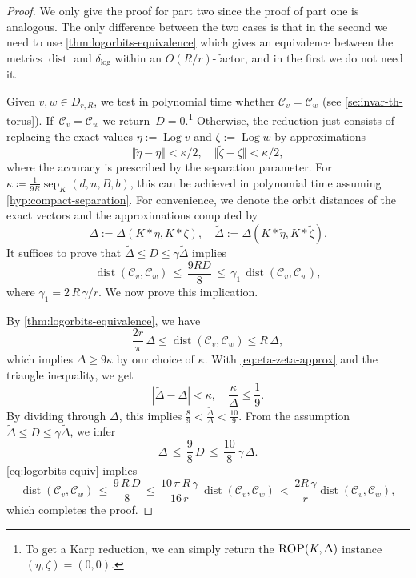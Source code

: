 \documentclass[10pt,a4paper]{article}
\theoremstyle{definition}
\DeclareMathOperator{\sep}{sep}
\DeclareMathOperator{\Log}{Log}
\DeclareMathOperator{\dist}{dist}
\newcommand{\distLD}{\delta_{\log}}
\newcommand{\KK}{\ensuremath{\mathcal{C}}}
\numberwithin{equation}{section}
\begin{document}
\begin{proof}
We only give the proof for part two since the proof of part one
is analogous. The only difference between the two cases is that in the second we need to use \cref{thm:logorbits-equivalence} which gives an equivalence between the metrics $\dist$ and $\distLD$ within an $O(R/r)$-factor, and in the first we do not need it. %

Given $v,w\in D_{r,R}$, we test in polynomial time whether
$\KK_v=\KK_w$ (see \cref{se:invar-th-torus}). %
If~$\KK_v=\KK_w$ we return~$D=0$.\footnote{To get a Karp reduction, we can simply return the $\textsc{ROP}(K,\Delta)$ instance $(\eta,\zeta)=(0,0)$.}
Otherwise, the reduction just consists of replacing the exact values
$\eta:=\Log v$ and $\zeta:=\Log w$
by approximations
\begin{equation}\label{eq:eta-zeta-approx}
  \Vert \tilde{\eta} - \eta\Vert< \kappa/2, \quad \Vert \tilde{\zeta} -\zeta\Vert < \kappa/2 ,
\end{equation}
where the accuracy is prescribed by the separation parameter.
For $\kappa\coloneqq \frac{1}{9R}\sep_K(d,n,B,b)$,
this can be achieved in polynomial time
assuming \cref{hyp:compact-separation}.
For convenience, we denote the orbit distances of the exact vectors
and the approximations computed by
$$
 \Delta:= \Delta(K\ast\eta, K\ast\zeta), \quad
 \tilde{\Delta} := \Delta(K\ast\tilde{\eta}, K\ast\tilde{\zeta}) .
$$
It suffices to prove that
$\tilde{\Delta} \leq D\leq \gamma \tilde{\Delta}$
implies
\[
  \dist(\KK_v,\KK_w) \, \leq \, \frac{9RD}8 \, \leq \, \gamma_1\, \dist(\KK_v,\KK_w),
\]
where $\gamma_1= 2\,R\,\gamma/r$.
We now prove this implication.

By \cref{thm:logorbits-equivalence},
we have %
\begin{equation}\label{eq:logorbits-equiv}
  \frac{2r}{\pi} \, \Delta \leq \dist(\KK_v,\KK_w)
    \leq R \, \Delta ,
\end{equation}
which implies $\Delta \ge 9 \kappa$ by our choice of $\kappa$.
With \cref{eq:eta-zeta-approx} and
the triangle inequality, we get
\begin{equation*} %
	| \tilde{\Delta} - \Delta | < \kappa, \quad \frac{\kappa}{\Delta} \le \frac{1}{9} .
\end{equation*}
By dividing through $\Delta$,
this implies
$\frac{8}{9} <\frac{\tilde{\Delta}}{\Delta} < \frac{10}{9}$.
From the assumption
$\tilde{\Delta} \leq D\leq \gamma \tilde{\Delta}$,
we infer
\[
  \Delta \, \leq \, \frac{9}{8} \, D \, \leq \, \frac{10}{8}\, \gamma \, \Delta .
\]
\cref{eq:logorbits-equiv} implies
\[
 \dist(\KK_v,\KK_w)\,  \leq \, \frac{ 9\, R  \, D}{8} \, \leq \,
 \frac{10\, \pi \, R \, \gamma}{16 \, r} \,\dist(\KK_v,\KK_w) \, <\, \frac{2 R\, \gamma}{r} \dist(\KK_v,\KK_w),
\]
which completes the proof.
\end{proof}
\end{document}
